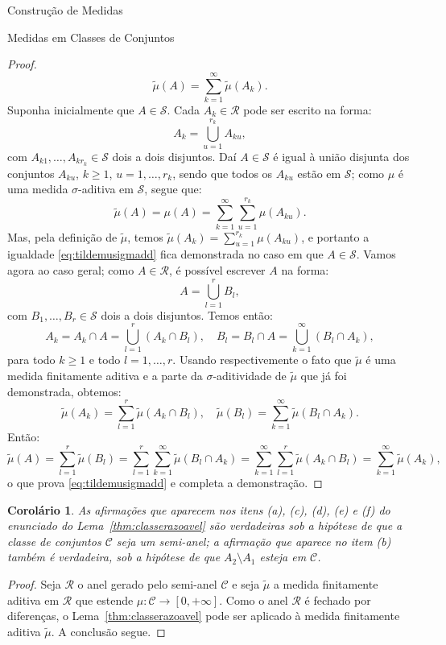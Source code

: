 \documentclass[oneside,final,11pt]{amsbook}
\theoremstyle{remark}\newtheorem{exercise}{Exercício}[chapter]
\theoremstyle{remark}\newtheorem{*exercise}[exercise]{\hbox to 0pt{\hskip 0pt minus 1fil*}Exercício}
\theoremstyle{definition}\newtheorem{exdefin}{Definição}[chapter]
\theoremstyle{plain}\newtheorem{teo}{Teorema}[section]
\theoremstyle{plain}\newtheorem{lem}[teo]{Lema}
\theoremstyle{plain}\newtheorem{prop}[teo]{Proposição}
\theoremstyle{plain}\newtheorem{cor}[teo]{Corolário}
\theoremstyle{definition}\newtheorem{defin}[teo]{Definição}
\theoremstyle{remark}\newtheorem{rem}[teo]{Observação}
\theoremstyle{definition}\newtheorem{notation}[teo]{Notação}
\theoremstyle{definition}\newtheorem{convention}[teo]{Convenção}
\theoremstyle{definition}\newtheorem{example}[teo]{Exemplo}
\numberwithin{section}{chapter}
\numberwithin{equation}{section}
\begin{document}
\begin{chapter}{Construção de Medidas}
\begin{section}{Medidas em Classes de Conjuntos}
\begin{proof}
\begin{equation}\label{eq:tildemusigmadd}
\tilde\mu(A)=\sum_{k=1}^\infty\tilde\mu(A_k).
\end{equation}
Suponha inicialmente que $A\in\mathcal S$. Cada $A_k\in\mathcal R$ pode ser escrito na forma:
\[A_k=\bigcup_{u=1}^{r_k}A_{ku},\]
com $A_{k1},\ldots,A_{kr_k}\in\mathcal S$ dois a dois disjuntos. Daí $A\in\mathcal S$ é igual à união
disjunta dos conjuntos $A_{ku}$, $k\ge1$, $u=1,\ldots,r_k$, sendo que todos os $A_{ku}$ estão em $\mathcal S$;
como $\mu$ é uma medida $\sigma$-aditiva em $\mathcal S$, segue que:
\[\tilde\mu(A)=\mu(A)=\sum_{k=1}^\infty\sum_{u=1}^{r_k}\mu(A_{ku}).\]
Mas, pela definição de $\tilde\mu$, temos $\tilde\mu(A_k)=\sum_{u=1}^{r_k}\mu(A_{ku})$, e portanto a igualdade
\eqref{eq:tildemusigmadd} fica demonstrada no caso em que $A\in\mathcal S$. Vamos agora ao caso geral;
como $A\in\mathcal R$, é possível escrever $A$ na forma:
\[A=\bigcup_{l=1}^rB_l,\]
com $B_1,\ldots,B_r\in\mathcal S$ dois a dois disjuntos. Temos então:
\[A_k=A_k\cap A=\bigcup_{l=1}^r(A_k\cap B_l),\quad B_l=B_l\cap A=\bigcup_{k=1}^\infty(B_l\cap A_k),\]
para todo $k\ge1$ e todo $l=1,\ldots,r$. Usando respectivemente o fato que $\tilde\mu$ é uma medida
finitamente aditiva e a parte da $\sigma$-aditividade de $\tilde\mu$ que já foi demonstrada, obtemos:
\[\tilde\mu(A_k)=\sum_{l=1}^r\tilde\mu(A_k\cap B_l),\quad\tilde\mu(B_l)=\sum_{k=1}^\infty\tilde\mu(B_l\cap A_k).\]
Então:
\[\tilde\mu(A)=\sum_{l=1}^r\tilde\mu(B_l)=\sum_{l=1}^r\sum_{k=1}^\infty\tilde\mu(B_l\cap A_k)=
\sum_{k=1}^\infty\sum_{l=1}^r\tilde\mu(A_k\cap B_l)=\sum_{k=1}^\infty\tilde\mu(A_k),\]
o que prova \eqref{eq:tildemusigmadd} e completa a demonstração.
\end{proof}

\begin{cor}\label{thm:cortambemnosemianel}
As afirmações que aparecem nos itens (a), (c), (d), (e) e (f) do enunciado do Lema~\ref{thm:classerazoavel}
são verdadeiras sob a hipótese de que a classe de conjuntos $\mathcal C$ seja um semi-anel;
a afirmação que aparece no item (b) também é verdadeira, sob a hipótese de que $A_2\setminus A_1$
esteja em $\mathcal C$.
\end{cor}
\begin{proof}
Seja $\mathcal R$ o anel gerado pelo semi-anel $\mathcal C$ e seja $\tilde\mu$
a medida finitamente aditiva em $\mathcal R$ que estende $\mu:\mathcal C\to[0,+\infty]$. Como o anel $\mathcal R$
é fechado por diferenças, o Lema~\ref{thm:classerazoavel} pode ser aplicado
à medida finitamente aditiva $\tilde\mu$. A conclusão segue.
\end{proof}


\end{section}
\end{chapter}
\end{document}
